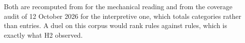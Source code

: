 Both are recomputed from  for the
mechanical reading and from the coverage audit of 12 October 2026 for the
interpretive one, which totals categories rather than entries. A duel on this
corpus would rank rules against rules, which is exactly what H2 observed.
